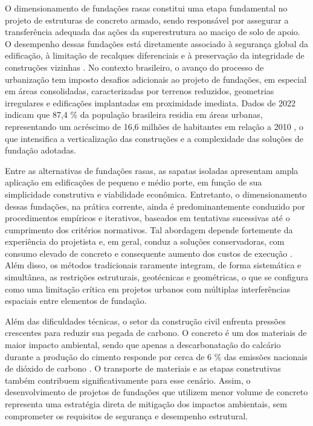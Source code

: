 
O dimensionamento de fundações rasas constitui uma etapa fundamental no projeto de estruturas de concreto armado, sendo responsável por assegurar a transferência adequada das ações da superestrutura ao maciço de solo de apoio. O desempenho dessas fundações está diretamente associado à segurança global da edificação, à limitação de recalques diferenciais e à preservação da integridade de construções vizinhas \cite{SantosCorrêa}. No contexto brasileiro, o avanço do processo de urbanização tem imposto desafios adicionais ao projeto de fundações, em especial em áreas consolidadas, caracterizadas por terrenos reduzidos, geometrias irregulares e edificações implantadas em proximidade imediata. Dados de 2022 indicam que 87,4 \% da população brasileira residia em áreas urbanas, representando um acréscimo de 16,6 milhões de habitantes em relação a 2010 \cite{IBGE2022_Censo}, o que intensifica a verticalização das construções e a complexidade das soluções de fundação adotadas.

Entre as alternativas de fundações rasas, as sapatas isoladas apresentam ampla aplicação em edificações de pequeno e médio porte, em função de sua simplicidade construtiva e viabilidade econômica. Entretanto, o dimensionamento dessas fundações, na prática corrente, ainda é predominantemente conduzido por procedimentos empíricos e iterativos, baseados em tentativas sucessivas até o cumprimento dos critérios normativos. Tal abordagem depende fortemente da experiência do projetista e, em geral, conduz a soluções conservadoras, com consumo elevado de concreto e consequente aumento dos custos de execução \cite{Moraesetal}. Além disso, os métodos tradicionais raramente integram, de forma sistemática e simultânea, as restrições estruturais, geotécnicas e geométricas, o que se configura como uma limitação crítica em projetos urbanos com múltiplas interferências espaciais entre elementos de fundação.

Além das dificuldades técnicas, o setor da construção civil enfrenta pressões crescentes para reduzir sua pegada de carbono. O concreto é um dos materiais de maior impacto ambiental, sendo que apenas a descarbonatação do calcário durante a produção do cimento responde por cerca de 6 \% das emissões nacionais de dióxido de carbono \cite{SantoroKripka}. O transporte de materiais e as etapas construtivas também contribuem significativamente para esse cenário. Assim, o desenvolvimento de projetos de fundações que utilizem menor volume de concreto representa uma estratégia direta de mitigação dos impactos ambientais, sem comprometer os requisitos de segurança e desempenho estrutural.

